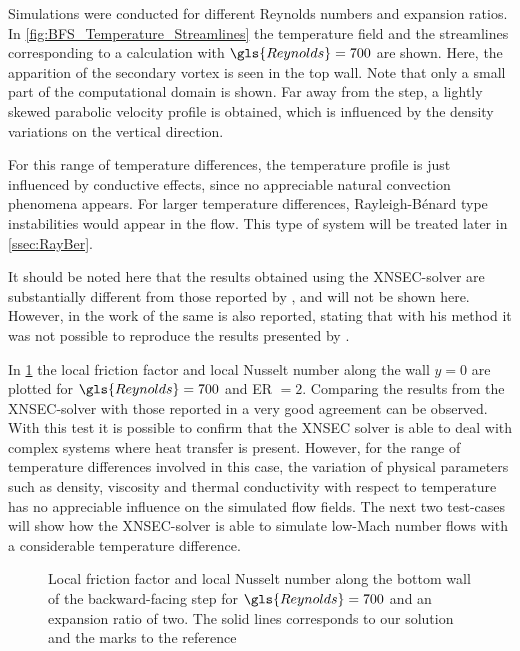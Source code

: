  Simulations were conducted for different Reynolds numbers and expansion ratios. In \cref{fig:BFS_Temperature_Streamlines} the temperature field and the streamlines corresponding to a calculation with $\gls{Reynolds} = 700$ are shown. Here, the apparition of the secondary vortex is seen in the top wall. Note that only a small part of the computational domain is shown. Far away from the step, a lightly skewed parabolic velocity profile is obtained, which is influenced by the density variations on the vertical direction.
 
 For this range of temperature differences, the temperature profile is just influenced by conductive effects, since no appreciable natural convection phenomena appears. For larger temperature differences, Rayleigh-Bénard type instabilities would appear in the flow. This type of system will be treated later in \cref{ssec:RayBer}.
 
It should be noted here that the results obtained using the XNSEC-solver are substantially different from those reported by \textcite{xieFluidFlowHeat2016}, and will not be shown here. However, in the work of \textcite{henninkLowMachNumberFlow2022} the same is also reported, stating that with his method it was not possible to reproduce the results presented by \textcite{xieFluidFlowHeat2016}. 

In \cref{fig:fd_Nu_plot} the local friction factor and local Nusselt number along the wall $y = 0$ are plotted for $\gls{Reynolds} = 700$ and ER $= 2$. Comparing the results from the XNSEC-solver with those reported in \textcite{henninkLowMachNumberFlow2022} a very good agreement can be observed.
With this test it is possible to confirm that the XNSEC solver is able to deal with complex systems where heat transfer is present. However, for the range of temperature differences involved in this case, the variation of physical parameters such as density, viscosity and thermal conductivity with respect to temperature has no appreciable influence on the simulated flow fields. The next two test-cases will show how the XNSEC-solver is able to simulate low-Mach number flows with a considerable temperature difference.
\begin{figure}[tb]
	\caption[Local friction factor and local Nusselt number along the bottom wall of the backward-facing step for $\gls{Reynolds} = 700$ and an expansion ratio of two.]{Local friction factor and local Nusselt number along the bottom wall of the backward-facing step for $\gls{Reynolds} = 700$ and an expansion ratio of two. The solid lines corresponds to our solution and the marks to the reference \parencite{henninkLowMachNumberFlow2022}}
	\label{fig:fd_Nu_plot}
\end{figure}%
\FloatBarrier%